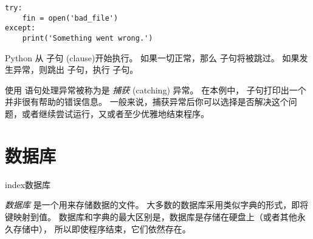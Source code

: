 {{{{{{{\begin{lstlisting}
try:
    fin = open('bad_file')
except:
    print('Something went wrong.')
\end{lstlisting}

%

Python 从  子句 (clause)开始执行。
如果一切正常，那么  子句将被跳过。
如果发生异常，则跳出  子句，执行  子句。


使用  语句处理异常被称为是 {\em 捕获} (catching) 异常。
在本例中， 子句打印出一个并非很有帮助的错误信息。
一般来说，捕获异常后你可以选择是否解决这个问题，或者继续尝试运行，又或者至少优雅地结束程序。


\section{数据库}
  index{数据库}


{\em 数据库} 是一个用来存储数据的文件。
大多数的数据库采用类似字典的形式，即将键映射到值。
数据库和字典的最大区别是，数据库是存储在硬盘上（或者其他永久存储中），
所以即使程序结束，它们依然存在。

 


}}}}}}}
